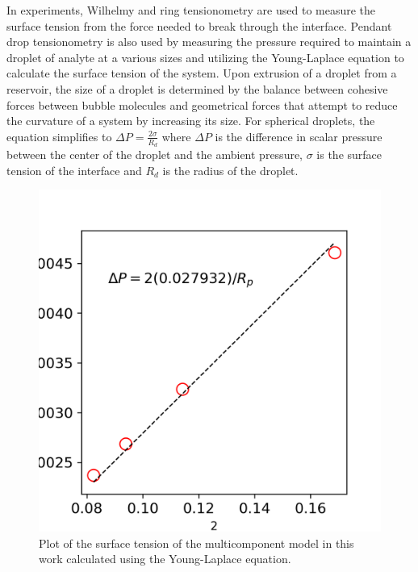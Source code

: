 In experiments, Wilhelmy and ring tensionometry are used to measure the surface tension from the force needed 
to break through the interface. Pendant drop tensionometry is also used by measuring the pressure required to 
maintain a droplet of analyte at a various sizes and utilizing the Young-Laplace equation to calculate the 
surface tension of the system. \cite{sun_assembly_2013, berry_measurement_2015}
Upon extrusion of a droplet from a reservoir, the size of a droplet is determined by the balance between 
cohesive forces between bubble molecules and geometrical forces that attempt to reduce the curvature of a 
system by increasing its size. For spherical droplets, the equation simplifies to 
$\Delta P = \frac{2 \sigma}{R_d}$ where $\Delta P$ is the difference in scalar pressure 
between the center of the droplet and the ambient pressure, $\sigma$ is the surface tension 
of the interface and $R_d$ is the radius of the droplet. 

\begin{figure}[h]
    \centering
    \includegraphics[scale = 0.5]{figures/model_validation/surface_tension.png}
    \caption{Plot of the surface tension of the multicomponent model in this work calculated using the 
    Young-Laplace equation.}
    \label{fig:young_laplace_valid}
\end{figure}

